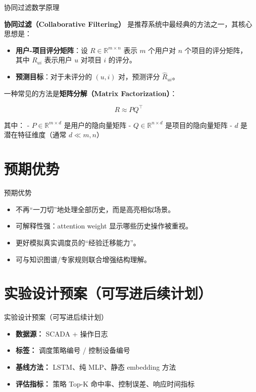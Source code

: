 \documentclass[11pt]{beamer}
\begin{document}
\begin{frame}{协同过滤数学原理}

\textbf{协同过滤（Collaborative Filtering）} 是推荐系统中最经典的方法之一，其核心思想是：
\medskip

\begin{itemize}
    \item \textbf{用户-项目评分矩阵}：设 $R \in \mathbb{R}^{m \times n}$ 表示 $m$ 个用户对 $n$ 个项目的评分矩阵，其中 $R_{ui}$ 表示用户 $u$ 对项目 $i$ 的评分。
    
    \item \textbf{预测目标}：对于未评分的 $(u, i)$ 对，预测评分 $\hat{R}_{ui}$。
\end{itemize}

\vspace{0.5cm}

一种常见的方法是\textbf{矩阵分解（Matrix Factorization）}：

\[
R \approx PQ^\top
\]

其中：
- $P \in \mathbb{R}^{m \times d}$ 是用户的隐向量矩阵
- $Q \in \mathbb{R}^{n \times d}$ 是项目的隐向量矩阵
- $d$ 是潜在特征维度（通常 $d \ll m, n$）

\vspace{0.5cm}

\end{frame}


\section{预期优势}

\begin{frame}{预期优势}
 \begin{itemize}
  \item 不再“一刀切”地处理全部历史，而是高亮相似场景。
  \item 可解释性强：attention weight 显示哪些历史操作被重视。
  \item 更好模拟真实调度员的“经验迁移能力”。
  \item 可与知识图谱/专家规则联合增强结构理解。
 \end{itemize}
\end{frame}

\section{实验设计预案（可写进后续计划）}

\begin{frame}{实验设计预案（可写进后续计划）}
 \begin{itemize}
  \item \textbf{数据源：} SCADA + 操作日志
  \item \textbf{标签：} 调度策略编号 / 控制设备编号
  \item \textbf{基线方法：} LSTM、纯 MLP、静态 embedding 方法
  \item \textbf{评估指标：} 策略 Top-K 命中率、控制误差、响应时间指标
 \end{itemize}
\end{frame}
\end{document}

